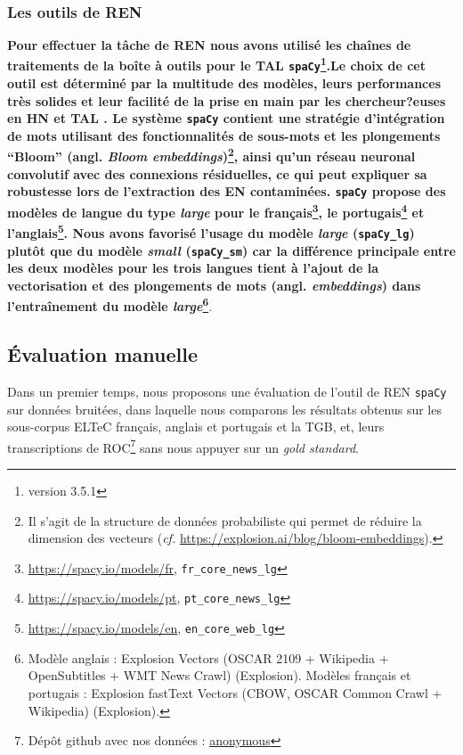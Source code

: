 \subsubsection{Les outils de REN}
\textbf{Pour effectuer la tâche de REN nous avons utilisé les chaînes de traitements de la boîte à outils pour le TAL  \texttt{spaCy}\footnote{version 3.5.1}.Le choix de cet outil est déterminé par la multitude des modèles, leurs performances très solides et leur facilité de la prise en main par les chercheur?euses en HN et TAL \cite{DBLP:conf/gis/Koudoro-Parfait21}.%
Le système \texttt{spaCy} contient une stratégie d'intégration de mots utilisant des fonctionnalités de sous-mots et les plongements ``Bloom'' (angl. \textit{Bloom embeddings})\footnote{Il s'agit de la structure de données probabiliste qui permet de réduire la dimension des vecteurs (\textit{cf.} \url{https://explosion.ai/blog/bloom-embeddings}).}, ainsi qu'un réseau neuronal convolutif avec des connexions résiduelles, ce qui peut expliquer sa robustesse lors de l'extraction des EN contaminées. \texttt{spaCy} propose des modèles de langue du type \textit{large} pour le français\footnote{\url{https://spacy.io/models/fr}, \texttt{fr\_core\_news\_lg}}, le portugais\footnote{\url{https://spacy.io/models/pt}, \texttt{pt\_core\_news\_lg}} et l'anglais\footnote{\url{https://spacy.io/models/en}, \texttt{en\_core\_web\_lg}}. Nous avons favorisé l'usage du modèle \textit{large} (\texttt{spaCy\_lg}) plutôt que du modèle \textit{small} (\texttt{spaCy\_sm}) car la différence principale entre les deux modèles pour les trois langues tient à l'ajout de la vectorisation et des plongements de mots (angl. \textit{embeddings}) dans l'entraînement du modèle \textit{large}\footnote{Modèle anglais : Explosion Vectors (OSCAR 2109 + Wikipedia + OpenSubtitles + WMT News Crawl) (Explosion). Modèles français et portugais :
Explosion fastText Vectors (CBOW, OSCAR Common Crawl + Wikipedia) (Explosion).}}.



\subsection{Évaluation manuelle}
\label{subsec:eval_manu_OCR-IMPACT-NER}
Dans un premier temps, nous proposons une évaluation de l'outil de REN \texttt{spaCy} sur données bruitées, dans laquelle nous comparons les résultats obtenus sur les sous-corpus ELTeC français, anglais et portugais et la TGB, et, leurs transcriptions de ROC\footnote{Dépôt github avec nos données : \url{anonymous}} sans nous appuyer sur un \textit{gold standard}.

